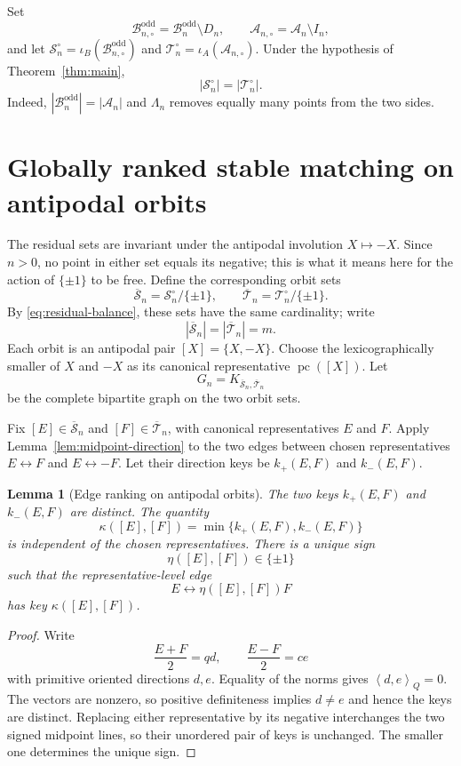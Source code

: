 \documentclass[11pt]{amsart}
\newtheorem{lemma}[theorem]{Lemma}
\theoremstyle{definition}
\theoremstyle{remark}
\newcommand{\An}{\mathcal A_n}
\newcommand{\Bodd}{\mathcal B_n^{\mathrm{odd}}}
\newcommand{\Boddres}{\mathcal B_{n,\circ}^{\mathrm{odd}}}
\newcommand{\Ares}{\mathcal A_{n,\circ}}
\newcommand{\Sres}{\mathcal S_n^{\circ}}
\newcommand{\Tres}{\mathcal T_n^{\circ}}
\newcommand{\Sbar}{\overline{\mathcal S}_n}
\newcommand{\Tbar}{\overline{\mathcal T}_n}
\newcommand{\pc}{\operatorname{pc}}
\newcommand{\Qip}[2]{\left\langle #1,#2\right\rangle_Q}
\begin{document}
Set
\[
 \Boddres=\Bodd\setminus D_n,
 \qquad
 \Ares=\An\setminus I_n,
\]
and let $\Sres=\iota_B(\Boddres)$ and
$\Tres=\iota_A(\Ares)$.
Under the hypothesis of Theorem~\ref{thm:main},
\begin{equation}\label{eq:residual-balance}
 |\Sres|=|\Tres|.
\end{equation}
Indeed, $|\Bodd|=|\An|$ and $\Lambda_n$ removes equally many points from the
two sides.

\section{Globally ranked stable matching on antipodal orbits}
\label{sec:projective}

The residual sets are invariant under the antipodal involution $X\mapsto-X$.
Since $n>0$, no point in either set equals its negative; this is what it means
here for the action of $\{\pm1\}$ to be free.  Define the corresponding
orbit sets
\[
 \Sbar=\Sres/\{\pm1\},
 \qquad
 \Tbar=\Tres/\{\pm1\}.
\]
By \eqref{eq:residual-balance}, these sets have the same cardinality; write
\[
 |\Sbar|=|\Tbar|=m.
\]
Each orbit is an antipodal pair $[X]=\{X,-X\}$.  Choose the lexicographically
smaller of $X$ and $-X$ as its canonical representative $\pc([X])$.  Let
\[
 G_n=K_{\Sbar,\Tbar}
\]
be the complete bipartite graph on the two orbit sets.

Fix $[E]\in\Sbar$ and $[F]\in\Tbar$, with canonical representatives $E$ and
$F$.  Apply Lemma~\ref{lem:midpoint-direction} to the two edges between
chosen representatives
$E\leftrightarrow F$ and $E\leftrightarrow -F$.  Let their direction keys be
$k_+(E,F)$ and $k_-(E,F)$.

\begin{lemma}[Edge ranking on antipodal orbits]\label{lem:projective-key}
The two keys $k_+(E,F)$ and $k_-(E,F)$ are distinct.  The quantity
\[
 \kappa([E],[F])=\min\{k_+(E,F),k_-(E,F)\}
\]
is independent of the chosen representatives.  There is a unique sign
\[
 \eta([E],[F])\in\{\pm1\}
\]
such that the representative-level edge
\[
 E\longleftrightarrow \eta([E],[F])F
\]
has key $\kappa([E],[F])$.
\end{lemma}

\begin{proof}
Write
\[
 \frac{E+F}{2}=qd,
 \qquad
 \frac{E-F}{2}=ce
\]
with primitive oriented directions $d,e$.  Equality of the norms gives
$\Qip{d}{e}=0$.  The vectors are nonzero, so positive definiteness implies
$d\ne e$ and hence the keys are distinct.  Replacing either representative by
its negative interchanges the two signed midpoint lines, so their unordered
pair of keys is unchanged.  The smaller one determines the unique sign.
\end{proof}
\end{document}
